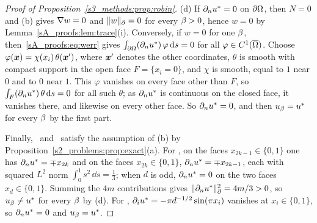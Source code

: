 \begin{proof}[Proof of Proposition~\ref{s3_methods:prop:robin}]
(d) If $\partial_nu^{*}=0$ on $\partial\Omega$, then $N=0$ and (b) gives $\nabla w=0$ and
$\lVert w\rVert_{\partial}=0$ for every $\beta>0$, hence $w=0$ by
Lemma~\ref{sA_proofs:lem:trace}(i). Conversely, if $w=0$ for one $\beta$,
then~\eqref{sA_proofs:eq:werr} gives $\int_{\partial\Omega}(\partial_nu^{*})\,\varphi\,\mathrm{d} s=0$ for all
$\varphi\in C^1(\overline{\Omega})$. Choose $\varphi(\boldsymbol{x})=\chi(x_i)\,\theta(\boldsymbol{x}')$, where $\boldsymbol{x}'$
denotes the other coordinates, $\theta$ is smooth with compact support in the open face
$F=\{x_i=0\}$, and $\chi$ is smooth, equal to $1$ near $0$ and to $0$ near $1$. This
$\varphi$ vanishes on every face other than $F$, so $\int_F(\partial_nu^{*})\,\theta\,\mathrm{d} s=0$ for
all such $\theta$; as $\partial_nu^{*}$ is continuous on the closed face, it vanishes there, and
likewise on every other face. So $\partial_nu^{*}=0$, and then $u_{\beta}=u^{*}$ for every $\beta$ by
the first part.

Finally, \Pone\ and \Ptwo\ satisfy the assumption of (b) by
Proposition~\ref{s2_problems:prop:exact}(a).
For \Pone, on the faces $x_{2k-1}\in\{0,1\}$ one has $\partial_nu^{*}=\mp x_{2k}$ and on the faces
$x_{2k}\in\{0,1\}$, $\partial_nu^{*}=\mp x_{2k-1}$, each with squared $L^2$ norm
$\int_0^1s^2\,\dd s=\tfrac13$; when $d$ is odd, $\partial_nu^{*}=0$ on the two faces
$x_d\in\{0,1\}$. Summing the $4m$ contributions gives $\lVert \partial_nu^{*}\rVert_{\partial}^2=4m/3>0$,
so $u_{\beta}\ne u^{*}$ for every $\beta$ by (d). For \Ptwo,
$\partial_iu^{*}=-\pi d^{-1/2}\sin(\pi x_i)$ vanishes at $x_i\in\{0,1\}$, so $\partial_nu^{*}=0$ and
$u_{\beta}=u^{*}$.
\end{proof}

